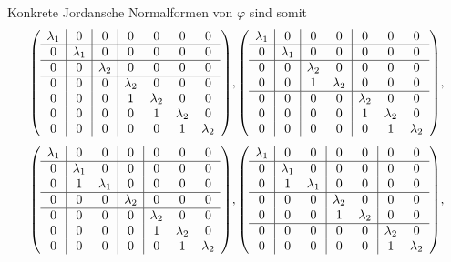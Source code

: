 \documentclass{scrreprt}
\begin{document}
Konkrete Jordansche Normalformen von $\varphi$ sind somit
\[
  \qty(\begin{array}{c|c|c|cccc}
    \lambda_1 & 0 & 0 & 0 & 0 & 0 & 0 \\
    \hline
    0 & \lambda_1 & 0 & 0 & 0 & 0 & 0 \\
    \hline
    0 & 0 & \lambda_2 & 0 & 0 & 0 & 0 \\
    \hline
    0 & 0 & 0 & \lambda_2 & 0 & 0 & 0 \\
    0 & 0 & 0 & 1 & \lambda_2 & 0 & 0 \\
    0 & 0 & 0 & 0 & 1 & \lambda_2 & 0 \\
    0 & 0 & 0 & 0 & 0 & 1 & \lambda_2 \\
  \end{array}), \qty(\begin{array}{c|c|cc|ccc}
    \lambda_1 & 0 & 0 & 0 & 0 & 0 & 0 \\
    \hline
    0 & \lambda_1 & 0 & 0 & 0 & 0 & 0 \\
    \hline
    0 & 0 & \lambda_2 & 0 & 0 & 0 & 0 \\
    0 & 0 & 1 & \lambda_2 & 0 & 0 & 0 \\
    \hline
    0 & 0 & 0 & 0 & \lambda_2 & 0 & 0 \\
    0 & 0 & 0 & 0 & 1 & \lambda_2 & 0 \\
    0 & 0 & 0 & 0 & 0 & 1 & \lambda_2 \\
  \end{array}),
\]
\[
  \qty(\begin{array}{c|cc|c|ccc}
    \lambda_1 & 0 & 0 & 0 & 0 & 0 & 0 \\
    \hline
    0 & \lambda_1 & 0 & 0 & 0 & 0 & 0 \\
    0 & 1 & \lambda_1 & 0 & 0 & 0 & 0 \\
    \hline
    0 & 0 & 0 & \lambda_2 & 0 & 0 & 0 \\
    \hline
    0 & 0 & 0 & 0 & \lambda_2 & 0 & 0 \\
    0 & 0 & 0 & 0 & 1 & \lambda_2 & 0 \\
    0 & 0 & 0 & 0 & 0 & 1 & \lambda_2 \\
  \end{array}), \qty(\begin{array}{c|cc|cc|cc}
    \lambda_1 & 0 & 0 & 0 & 0 & 0 & 0 \\
    \hline
    0 & \lambda_1 & 0 & 0 & 0 & 0 & 0 \\
    0 & 1 & \lambda_1 & 0 & 0 & 0 & 0 \\
    \hline
    0 & 0 & 0 & \lambda_2 & 0 & 0 & 0 \\
    0 & 0 & 0 & 1 & \lambda_2 & 0 & 0 \\
    \hline
    0 & 0 & 0 & 0 & 0 & \lambda_2 & 0 \\
    0 & 0 & 0 & 0 & 0 & 1 & \lambda_2 \\
  \end{array}),
\]
\end{document}
